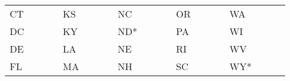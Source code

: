 \documentclass[100pt]{article}
\begin{document}
\begin{adjustbox}{valign=t}
\begin{tabular}{@{}ll|l|l||ll|l|l||ll|l|l||ll|l|l||ll|l|l@{}}
CT & \cellcolor{red}    & \cellcolor{red}    & \cellcolor{red} & KS  & \cellcolor{red}  & \cellcolor{red}  & \cellcolor{red}  & NC  & \cellcolor{red}    & \cellcolor{red}    & \cellcolor{red}    & OR & \cellcolor{blue} & \cellcolor{red}  & \cellcolor{red} & WA  & \cellcolor{blue}   & \cellcolor{red}    & \cellcolor{red}  \\
DC & \cellcolor{yellow} & \cellcolor{yellow} & \cellcolor{red} & KY  & \cellcolor{red}  & \cellcolor{red}  & \cellcolor{red}  & ND* & \cellcolor{blue}   & \cellcolor{blue}   & \cellcolor{blue}   & PA & \cellcolor{red}  & \cellcolor{red}  & \cellcolor{red} & WI  & \cellcolor{blue}   & \cellcolor{blue}   & \cellcolor{blue} \\
DE & \cellcolor{yellow} & \cellcolor{yellow} & \cellcolor{red} & LA  & \cellcolor{red}  & \cellcolor{red}  & \cellcolor{red}  & NE  & \cellcolor{red}    & \cellcolor{red}    & \cellcolor{red}    & RI & \cellcolor{red}  & \cellcolor{red}  & \cellcolor{red} & WV  & \cellcolor{red}    & \cellcolor{red}    & \cellcolor{red}  \\
FL & \cellcolor{red}    & \cellcolor{red}    & \cellcolor{red} & MA  & \cellcolor{red}  & \cellcolor{red}  & \cellcolor{red}  & NH  & \cellcolor{red}    & \cellcolor{red}    & \cellcolor{red}    & SC & \cellcolor{red}  & \cellcolor{red}  & \cellcolor{red} & WY* & \cellcolor{blue}   & \cellcolor{red}    & \cellcolor{red}  \\ \bottomrule
\end{tabular}
\end{adjustbox}
\end{document}
